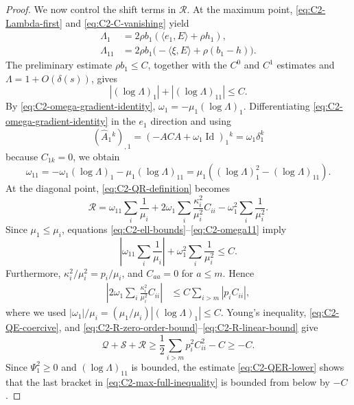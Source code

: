 \documentclass[11pt, reqno]{amsart}
\theoremstyle{remark}
\theoremstyle{definition}
\numberwithin{equation}{section}
\newcommand{\Id}{\operatorname{Id}}
\begin{document}
\begin{proof}
We now control the shift terms in $\mathcal R$.  At the maximum point,
\eqref{eq:C2-Lambda-first} and \eqref{eq:C2-C-vanishing} yield
\begin{equation*}
\begin{split}
        \Lambda_1&=2\rho b_1(\langle e_1,E\rangle+\rho h_1),\\
        \Lambda_{11}
        &=2\rho b_1\bigl(-\langle\xi,E\rangle
                          +\rho(b_1-h)\bigr).
\end{split}
\end{equation*}
The preliminary estimate $\rho b_1\le C$, together with the $C^0$ and
$C^1$ estimates and $\Lambda=1+O(\delta(s))$, gives
\begin{equation}\label{eq:C2-ell-bounds}
        |(\log\Lambda)_1|+|(\log\Lambda)_{11}|\le C.
\end{equation}
By \eqref{eq:C2-omega-gradient-identity}, $ \omega_1=-\mu_1(\log\Lambda)_1$.  
Differentiating \eqref{eq:C2-omega-gradient-identity} in the $e_1$
direction and using
\begin{equation*}
        (\widehat A_1{}^k)_{,1}
        =(-ACA+\omega_1\Id)_1{}^k
        =\omega_1\delta_1^k
\end{equation*}
because $C_{1k}=0$, we obtain
\begin{equation}\label{eq:C2-omega11}
        \omega_{11}
        =-\omega_1(\log\Lambda)_1-\mu_1(\log\Lambda)_{11}
        =\mu_1\left((\log\Lambda)_1^2-(\log\Lambda)_{11}\right).
\end{equation}
At the diagonal point, \eqref{eq:C2-QR-definition} becomes
\begin{equation*}
        \mathcal R
        =\omega_{11}\sum_i\frac1{\mu_i}
          +2\omega_1\sum_i\frac{\kappa_i^2}{\mu_i^2}C_{ii}
          -\omega_1^2\sum_i\frac1{\mu_i^2}.
\end{equation*}
Since $\mu_1\le\mu_i$, equations
\eqref{eq:C2-ell-bounds}--\eqref{eq:C2-omega11} imply
\begin{equation}\label{eq:C2-R-zero-order-bound}
        \left|\omega_{11}\sum_i\frac1{\mu_i}\right|
        +\omega_1^2\sum_i\frac1{\mu_i^2}
        \le C.
\end{equation}
Furthermore, $\kappa_i^2/\mu_i^2=p_i/\mu_i$, and
$C_{aa}=0$ for $a\le m$.  Hence
\begin{equation}\label{eq:C2-R-linear-bound}
\begin{split}
        \left|2\omega_1\sum_i
                    \frac{\kappa_i^2}{\mu_i^2}C_{ii}\right|
        &\le C\sum_{i>m}|p_iC_{ii}|,
\end{split}
\end{equation}
where we used
$|\omega_1|/\mu_i=(\mu_1/\mu_i)|(\log\Lambda)_1|\le C$.
Young's inequality, \eqref{eq:C2-QE-coercive}, and
\eqref{eq:C2-R-zero-order-bound}--\eqref{eq:C2-R-linear-bound} give
\begin{equation}\label{eq:C2-QER-lower}
        \mathcal Q+\mathcal S+\mathcal R
        \ge \frac12\sum_{i>m}p_i^2C_{ii}^2-C
        \ge-C.
\end{equation}
Since $\Psi_1^2\ge0$ and $(\log\Lambda)_{11}$ is bounded, the estimate \eqref{eq:C2-QER-lower} shows that the last bracket in
\eqref{eq:C2-max-full-inequality} is bounded from below by $-C$.


\end{proof}
\end{document}
